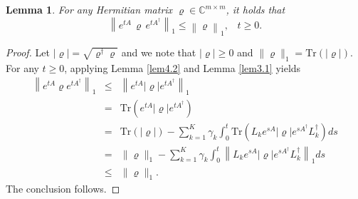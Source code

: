 \documentclass[preprint,3p,compress,12pt]{elsarticle}
\numberwithin{equation}{section}
\newtheorem{lemma}[theorem]{Lemma}
\numberwithin{figure}{section}
\begin{document}
\begin{lemma}\label{lem4.1}
   For any Hermitian matrix $\varrho\in \mathbb{C}^{m\times m}$, it holds that
  \begin{equation*}
    \left\|e^{tA} \, \varrho \, e^{tA^{\dag}}\right\|_1\leq \left\|\varrho\right\|_1,~~~\, t\geq0.
  \end{equation*}
\end{lemma}
\begin{proof}
 Let $|\varrho|=\sqrt{\varrho^{\dag}\varrho}$ and we note that $|\varrho|\geq0$ and $\|\varrho\|_1=\mbox{Tr}(|\varrho|)$.
 For any $t\geq0$, applying Lemma \ref{lem4.2} and Lemma \ref{lem3.1} yields
  \begin{eqnarray*}
    \left\|e^{tA}\varrho e^{tA^{\dag}}\right\|_1&\leq& \left\|e^{tA}|\varrho| e^{tA^{\dag}}\right\|_1 \\
    &=&\mbox{Tr}\left(e^{tA}|\varrho| e^{tA^{\dag}}\right)\\
    &=&\mbox{Tr}(|\varrho|)-\sum_{k=1}^K\gamma_k\int_0^t\mbox{Tr}\left(L_ke^{sA}|\varrho| e^{sA^{\dag}} L_k^{\dag}\right)ds\\
    &=&\|\varrho\|_1-\sum_{k=1}^K\gamma_k\int_0^t\left\|L_ke^{sA}|\varrho| e^{sA^{\dag}} L_k^{\dag}\right\|_1ds\\
    &\leq&\|\varrho\|_1.
  \end{eqnarray*}
  The conclusion follows.
\end{proof}
\end{document}
